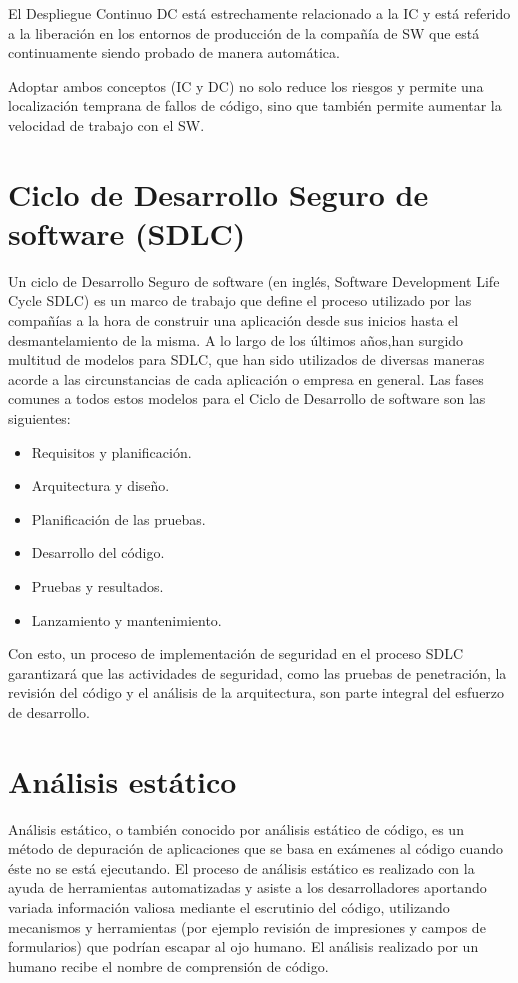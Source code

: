 El Despliegue Continuo \gls{DC} está estrechamente relacionado a la \gls{IC} y está referido a la liberación en los entornos de producción de la compañía de \gls{SW} que está continuamente siendo probado de manera automática.

Adoptar ambos conceptos (\gls{IC} y \gls{DC}) no solo reduce los riesgos y permite una localización temprana de fallos de código, sino que también permite aumentar la velocidad de trabajo con el \gls{SW}\cite{IC2017}.

\section{Ciclo de Desarrollo Seguro de software (\gls{SDLC})}

Un ciclo de Desarrollo Seguro de software (en inglés, Software Development Life Cycle \gls{SDLC}) es un marco de trabajo que define el proceso utilizado por las compañías a la hora de construir una aplicación desde sus inicios hasta el desmantelamiento de la misma. A lo largo de los últimos años,han surgido multitud de modelos para \gls{SDLC}, que han sido utilizados de diversas maneras acorde a las circunstancias de cada aplicación o empresa en general. Las fases comunes a todos estos modelos para el Ciclo de Desarrollo de software son las siguientes:

\begin{itemize}
	\item Requisitos y planificación.
	\item Arquitectura y diseño.
	\item Planificación de las pruebas.
	\item Desarrollo del código.
	\item Pruebas y resultados.
	\item Lanzamiento y mantenimiento.
\end{itemize}

Con esto, un proceso de implementación de seguridad en el proceso \gls{SDLC} garantizará que las actividades de seguridad, como las pruebas de penetración, la revisión del código y el análisis de la arquitectura, son parte integral del esfuerzo de desarrollo.

\section{Análisis estático}

Análisis estático, o también conocido por análisis estático de código, es un método de depuración de aplicaciones que se basa en exámenes al código cuando éste no se está ejecutando. El proceso de análisis estático es realizado con la ayuda de herramientas automatizadas y asiste a los desarrolladores aportando variada información valiosa mediante el escrutinio del código, utilizando mecanismos y herramientas (por ejemplo revisión de impresiones y campos de formularios) que podrían escapar al ojo humano. El análisis realizado por un humano recibe el nombre de comprensión de código\cite{rouse2017}.

